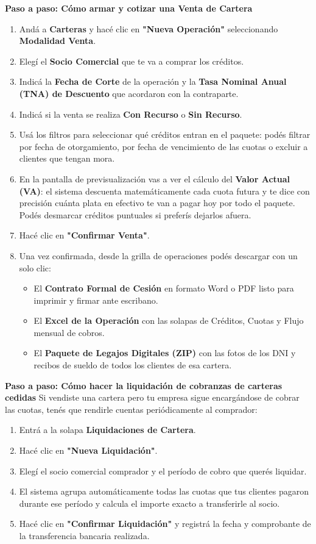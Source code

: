 \documentclass[12pt,a4paper]{article}
\renewcommand{\_}{\textunderscore\allowbreak}
\begin{document}
\textbf{Paso a paso: Cómo armar y cotizar una Venta de Cartera}
\begin{enumerate}
    \item Andá a \textbf{Carteras} y hacé clic en \textbf{"Nueva Operación"} seleccionando \textbf{Modalidad Venta}.
    \item Elegí el \textbf{Socio Comercial} que te va a comprar los créditos.
    \item Indicá la \textbf{Fecha de Corte} de la operación y la \textbf{Tasa Nominal Anual (TNA) de Descuento} que acordaron con la contraparte.
    \item Indicá si la venta se realiza \textbf{Con Recurso} o \textbf{Sin Recurso}.
    \item Usá los filtros para seleccionar qué créditos entran en el paquete: podés filtrar por fecha de otorgamiento, por fecha de vencimiento de las cuotas o excluir a clientes que tengan mora.
    \item En la pantalla de previsualización vas a ver el cálculo del \textbf{Valor Actual (VA)}: el sistema descuenta matemáticamente cada cuota futura y te dice con precisión cuánta plata en efectivo te van a pagar hoy por todo el paquete. Podés desmarcar créditos puntuales si preferís dejarlos afuera.
    \item Hacé clic en \textbf{"Confirmar Venta"}.
    \item Una vez confirmada, desde la grilla de operaciones podés descargar con un solo clic:
          \begin{itemize}
              \item El \textbf{Contrato Formal de Cesión} en formato Word o PDF listo para imprimir y firmar ante escribano.
              \item El \textbf{Excel de la Operación} con las solapas de Créditos, Cuotas y Flujo mensual de cobros.
              \item El \textbf{Paquete de Legajos Digitales (ZIP)} con las fotos de los DNI y recibos de sueldo de todos los clientes de esa cartera.
          \end{itemize}
\end{enumerate}

\textbf{Paso a paso: Cómo hacer la liquidación de cobranzas de carteras cedidas}
Si vendiste una cartera pero tu empresa sigue encargándose de cobrar las cuotas, tenés que rendirle cuentas periódicamente al comprador:
\begin{enumerate}
    \item Entrá a la solapa \textbf{Liquidaciones de Cartera}.
    \item Hacé clic en \textbf{"Nueva Liquidación"}.
    \item Elegí el socio comercial comprador y el período de cobro que querés liquidar.
    \item El sistema agrupa automáticamente todas las cuotas que tus clientes pagaron durante ese período y calcula el importe exacto a transferirle al socio.
    \item Hacé clic en \textbf{"Confirmar Liquidación"} y registrá la fecha y comprobante de la transferencia bancaria realizada.
\end{enumerate}
\end{document}
